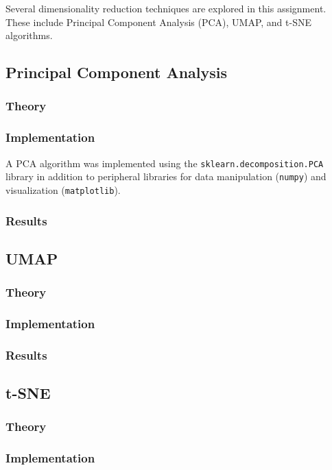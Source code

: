 \documentclass[12pt]{article}
\begin{document}
Several dimensionality reduction techniques are explored in this assignment. These include Principal Component Analysis (PCA), UMAP, and t-SNE algorithms.

\subsection{Principal Component Analysis}
\subsubsection{Theory}

\subsubsection{Implementation}
A PCA algorithm was implemented using the \verb|sklearn.decomposition.PCA| library in addition to peripheral libraries for data manipulation (\verb|numpy|) and visualization (\verb|matplotlib|).

\subsubsection{Results}

\subsection{UMAP}
\subsubsection{Theory}

\subsubsection{Implementation}

\subsubsection{Results}

\subsection{t-SNE}
\subsubsection{Theory}

\subsubsection{Implementation}
\end{document}
